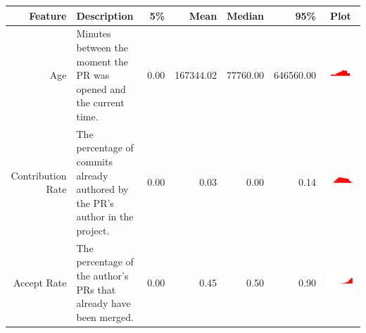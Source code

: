 \begin{table}[ht]
  \centering
  \begin{tabular}{rp{26em}rrrrc}
    \hline
    \textbf{Feature} & \textbf{Description} & \textbf{5\%} & \textbf{Mean} & \textbf{Median} & \textbf{95\%} & \textbf{Plot} \\
    \hline
    Age & Minutes between the moment the PR was opened and the current time. & 0.00 & 167344.02 & 77760.00 & 646560.00 & \includegraphics[scale = 0.1, clip = true, trim= 50px 60px 50px 60px]{../figs/hist-features/hist-age.pdf} \\
    Contribution Rate & The percentage of commits already authored by the PR's author in the project. & 0.00 & 0.03 & 0.00 & 0.14 & \includegraphics[scale = 0.1, clip = true, trim= 50px 60px 50px 60px]{../figs/hist-features/hist-commitRatio.pdf} \\
    Accept Rate & The percentage of the author's PRs that already have been merged. & 0.00 & 0.45 & 0.50 & 0.90 & \includegraphics[scale = 0.1, clip = true, trim= 50px 60px 50px 60px]{../figs/hist-features/hist-pullRequestRatio.pdf} \\

\end{tabular}
\end{table}
